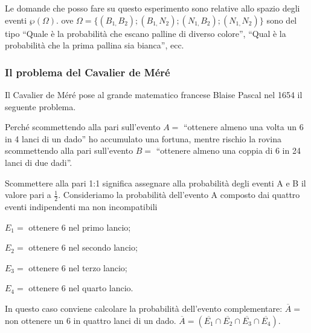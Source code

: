 \begin{esempio}
\begin{center}
\end{center}

Le domande che posso fare su questo esperimento sono relative allo spazio 
degli 
eventi $\wp (\Omega ).$ ove $\Omega 
=\{(B_{1,}B_2);(B_{1,}N_2);(N_{1,}B_2);(N_{1,}N_2)\}$ sono del tipo ``Quale è 
la 
probabilità che escano palline di diverso colore'', ``Qual è la probabilità 
che 
la prima pallina sia bianca'', ecc.
\end{esempio}

\subsubsection*{Il problema del Cavalier de Méré}
Il Cavalier de Méré pose al grande matematico francese Blaise Pascal nel 1654 
il 
seguente problema.
\begin{problema}
Perché scommettendo alla pari sull'evento $ A= $ ``ottenere almeno una volta 
un 
6 in 4 lanci di un dado'' ho accumulato una fortuna, mentre rischio la rovina 
scommettendo alla pari sull'evento $ B= $ ``ottenere almeno una coppia di 6 
in 
24 lanci di due dadi''.
\end{problema}
Scommettere alla pari 1:1 significa assegnare alla probabilità degli eventi A 
e 
B il valore pari a $\frac 1 2$.
Consideriamo la probabilità dell'evento A composto dai quattro eventi 
indipendenti ma non incompatibili
\begin{itemize*}
\item $ E_1= $ ottenere 6 nel primo lancio;
\item $ E_{2}= $ ottenere 6 nel secondo lancio;
\item $ E_{3}= $ ottenere 6 nel terzo lancio;
\item $ E_{4}= $ ottenere 6 nel quarto lancio.
\end{itemize*}
In questo caso conviene calcolare la probabilità dell'evento complementare: 
$\overline A=$ non ottenere un 6 in quattro lanci di un dado.
$\overline A=(\overline{E_1}\cap \overline{E_2}\cap \overline{E_3}\cap 
\overline{E_4})$.

